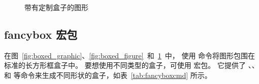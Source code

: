 \begin{figure}
	\centering
	\setlength{\fboxrule}{3pt}
	\setlength{\fboxsep}{1cm}
	\caption{带有定制盒子的图形}
	\label{fig:boxed_custom}
\end{figure}


\subsection{fancybox 宏包} \label{ssec:fancybox}

在图~\ref{fig:boxed_graphic}、\ref{fig:boxed_figure}~和~\ref{fig:boxed_custom}~中，
使用  命令将图形包围在标准的长方形框盒子中。
要想使用不同类型的盒子，可使用  宏包。
它提供了 、、 和  等命令来生成不同形状的盒子，如表~\ref{tab:fancyboxcmd} 所示。

